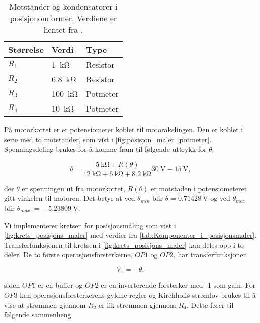 \begin{table}[h!]
    \centering
    \caption{Motstander og kondensatorer i posisjonomformer. Verdiene er hentet fra \cite{AnalogMotorlabbOppgaver}.}
    \begin{tabular}{lll}
        \toprule
        Størrelse & Verdi & Type \\
		\midrule
        $R_1$ & \SI{1}{\kilo\ohm} & Resistor\\
        $R_2$ & \SI{6.8}{\kilo\ohm} & Resistor \\
        $R_3$ & \SI{100}{\kilo\ohm} & Potmeter \\
        $R_4$ & \SI{10}{\kilo\ohm} & Potmeter \\
        \bottomrule
    \end{tabular}
    \label{tab:Komponenter_i_posisjonsmaler}
\end{table}

På motorkortet er et potensiometer koblet til motorakslingen. Den er koblet i serie med to motstander, som vist i \autoref{fig:posisjon_maler_potmeter}. Spenningsdeling brukes for å komme fram til følgende uttrykk for $\theta$.

\begin{equation}
    \label{eq:V_av_theta}
    \theta = \frac{\SI{5}{\kilo\ohm} + R(\theta)}{\SI{12}{\kilo\ohm} + \SI{5}{\kilo\ohm} + \SI{8.2}{\kilo\ohm}} \SI{30}{\volt} - \SI{15}{\volt},
\end{equation}

der $\theta$ er spenningen ut fra motorkortet, $R(\theta)$ er motstaden i potensiometeret gitt vinkelen til motoren. Det betyr at ved $\theta_{min}$ blir $\theta = \SI{0.71428}{\volt}$ og ved $\theta_{max}$ blir $\theta_{max}~=~\SI{-5.23809}{\volt}$.

Vi implementerer kretsen for posisjonsmåling som vist i \autoref{fig:krets_posisjons_maler} med verdier fra \autoref{tab:Komponenter_i_posisjonsmaler}.
Transferfunksjonen til kretsen i \autoref{fig:krets_posisjons_maler} kan deles opp i to deler. De to første operasjonsforsterkerne, $OP1$ og $OP2$, har transferfunksjonen

\begin{equation}
    \label{eq:posisjon_maler_deltransferfunksjon}
    V_x = -\theta,
\end{equation}

siden $OP1$ er en buffer og $OP2$ er en inverterende forsterker med -1 som gain.
For $OP3$ kan operasjonsforsterkerens gyldne regler og Kirchhoffs strømlov brukes til å vise at strømmen gjennom $R_2$ er lik strømmen gjennom $R_4$. Dette fører til følgende sammenheng

